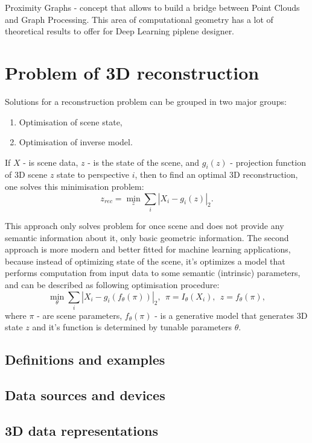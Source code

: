 Proximity Graphs - concept that allows to build a bridge between Point Clouds and Graph Processing. This area of computational geometry has a lot of theoretical results to offer for Deep Learning piplene designer.


\section{Problem of 3D reconstruction}

Solutions for a reconstruction problem can be grouped in two major groups:
\begin{enumerate}
    \item Optimisation of scene state,
    \item Optimisation of inverse model.
\end{enumerate}

If $X$ - is scene data, $z$ - is the state of the scene, and $g_i(z)$ - projection function of 3D scene $z$ state to perspective $i$, then to find an optimal 3D reconstruction, one solves this minimisation problem:
\begin{equation}
z_{rec} = \min_z\sum_i|X_i-g_i(z)|_2 .
\end{equation}

This approach only solves problem for once scene and does not provide any semantic information about it, only basic geometric information. 
The second approach is more modern and better fitted for machine learning applications, because instead of optimizing state of the scene, it's optimizes a model that performs computation from input data to some semantic (intrinsic) parameters, and can be described as following optimisation procedure:
\begin{equation}
\min_\theta\sum_i|X_i-g_i(f_\theta(\pi))|_2,\ \ \pi=I_\theta(X_i),\ \ z=f_\theta(\pi),
\end{equation}
where $\pi$ - are scene parameters, $f_\theta(\pi)$ - is a generative model that generates 3D state $z$ and it's function is determined by tunable parameters $\theta$.


\subsection{Definitions and examples}
\subsection{Data sources and devices}
\subsection{3D data representations}

